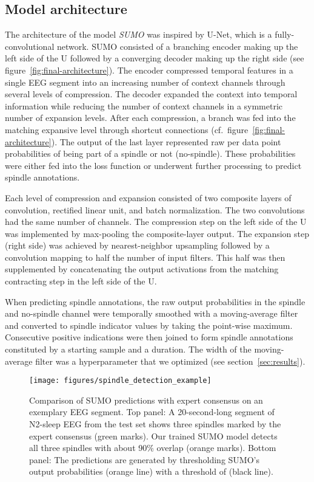 \documentclass[fleqn,twocolumn,10pt]{wlscirep}
\begin{document}
\subsection{Model architecture}

The architecture of the model \emph{SUMO} was inspired by U-Net\cite{Ronneberger2015}, which is a
fully-convolutional network. SUMO consisted of a branching encoder making up the left
side of the U followed by a converging decoder making up the right side (see
figure~\ref{fig:final-architecture}).
The encoder compressed temporal features in a single EEG segment into an
increasing number of context channels through several levels of compression.
The decoder expanded the context into temporal information while reducing the
number of context channels in a symmetric number of expansion levels.  After
each compression, a branch was fed into the matching expansive level through
shortcut connections (cf.~figure~\ref{fig:final-architecture}).  The output of the
last layer represented raw per data point probabilities of being part of a spindle or not (no-spindle).
These probabilities 
were either fed into the loss function or underwent further processing to
predict spindle annotations.

Each level of compression and expansion consisted of two composite layers of
convolution\cite{Krizhevsky2012}, rectified linear unit\cite{Nair2010}, and
batch normalization\cite{Ioffe2015}.  The two convolutions had the same number
of channels.  The compression step on the left side of the U was implemented by
max-pooling the composite-layer output.  The expansion step (right side)
was achieved by nearest-neighbor upsampling followed by a convolution mapping to
half the number of input filters.  This half was then supplemented by
concatenating the output activations from the matching contracting step in the
left side of the U.

When predicting spindle annotations, the raw output probabilities in the spindle
and no-spindle channel were temporally smoothed with a moving-average filter and converted to spindle
indicator values by taking the point-wise maximum.  Consecutive positive
indications were then joined to form spindle annotations constituted by a
starting sample and a duration.
The width of the moving-average filter was a hyperparameter that we
optimized (see section~\ref{sec:results}).

\begin{figure*}[t]
	\centering
	\texttt{[image: figures/spindle\_detection\_example]}
	\caption{
		Comparison of SUMO predictions with expert consensus on an
		exemplary EEG segment.  Top panel: A 20-second-long segment of
		N2-sleep EEG from the test set shows three spindles marked by
		the expert consensus (green marks).  Our trained SUMO model
		detects all three spindles with about 90\% overlap (orange marks).
		Bottom panel: The predictions are generated by thresholding
		SUMO's output probabilities (orange line) with a threshold of
		 (black line).
	}
	\label{fig:spindle-detection-example}
\end{figure*}
\end{document}
